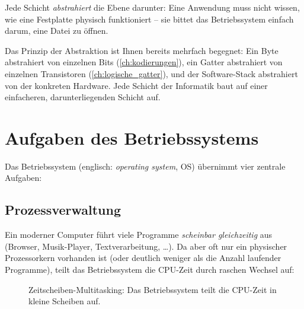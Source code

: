 Jede Schicht \emph{abstrahiert} die Ebene darunter: Eine Anwendung muss nicht wissen, wie eine Festplatte physisch funktioniert -- sie bittet das Betriebssystem einfach darum, eine Datei zu öffnen.

\begin{myremark}
    Das Prinzip der Abstraktion ist Ihnen bereits mehrfach begegnet: Ein Byte abstrahiert von einzelnen Bits (\cref{ch:kodierungen}), ein Gatter abstrahiert von einzelnen Transistoren (\cref{ch:logische_gatter}), und der Software-Stack abstrahiert von der konkreten Hardware. Jede Schicht der Informatik baut auf einer einfacheren, darunterliegenden Schicht auf.
\end{myremark}

\section{Aufgaben des Betriebssystems}

Das Betriebssystem (englisch: \emph{operating system}, OS) übernimmt vier zentrale Aufgaben:

\subsection{Prozessverwaltung}

Ein moderner Computer führt viele Programme \emph{scheinbar gleichzeitig} aus (Browser, Musik-Player, Textverarbeitung, \ldots). Da aber oft nur ein physischer Prozessorkern vorhanden ist (oder deutlich weniger als die Anzahl laufender Programme), teilt das Betriebssystem die CPU-Zeit durch raschen Wechsel auf:

\begin{figure}[H]
    \centering
    \caption{Zeitscheiben-Multitasking: Das Betriebssystem teilt die CPU-Zeit in kleine Scheiben auf.}
    \label{fig:multitasking}
\end{figure}

